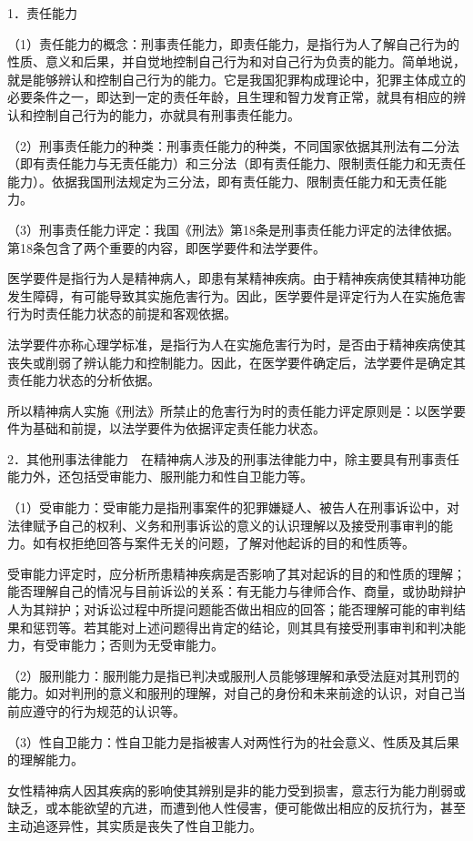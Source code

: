 1．责任能力

（1）责任能力的概念：刑事责任能力，即责任能力，是指行为人了解自己行为的性质、意义和后果，并自觉地控制自己行为和对自己行为负责的能力。简单地说，就是能够辨认和控制自己行为的能力。它是我国犯罪构成理论中，犯罪主体成立的必要条件之一，即达到一定的责任年龄，且生理和智力发育正常，就具有相应的辨认和控制自己行为的能力，亦就具有刑事责任能力。

（2）刑事责任能力的种类：刑事责任能力的种类，不同国家依据其刑法有二分法（即有责任能力与无责任能力）和三分法（即有责任能力、限制责任能力和无责任能力）。依据我国刑法规定为三分法，即有责任能力、限制责任能力和无责任能力。

（3）刑事责任能力评定：我国《刑法》第18条是刑事责任能力评定的法律依据。第18条包含了两个重要的内容，即医学要件和法学要件。

医学要件是指行为人是精神病人，即患有某精神疾病。由于精神疾病使其精神功能发生障碍，有可能导致其实施危害行为。因此，医学要件是评定行为人在实施危害行为时责任能力状态的前提和客观依据。

法学要件亦称心理学标准，是指行为人在实施危害行为时，是否由于精神疾病使其丧失或削弱了辨认能力和控制能力。因此，在医学要件确定后，法学要件是确定其责任能力状态的分析依据。

所以精神病人实施《刑法》所禁止的危害行为时的责任能力评定原则是：以医学要件为基础和前提，以法学要件为依据评定责任能力状态。

2．其他刑事法律能力　在精神病人涉及的刑事法律能力中，除主要具有刑事责任能力外，还包括受审能力、服刑能力和性自卫能力等。

（1）受审能力：受审能力是指刑事案件的犯罪嫌疑人、被告人在刑事诉讼中，对法律赋予自己的权利、义务和刑事诉讼的意义的认识理解以及接受刑事审判的能力。如有权拒绝回答与案件无关的问题，了解对他起诉的目的和性质等。

受审能力评定时，应分析所患精神疾病是否影响了其对起诉的目的和性质的理解；能否理解自己的情况与目前诉讼的关系：有无能力与律师合作、商量，或协助辩护人为其辩护；对诉讼过程中所提问题能否做出相应的回答；能否理解可能的审判结果和惩罚等。若其能对上述问题得出肯定的结论，则其具有接受刑事审判和判决能力，有受审能力；否则为无受审能力。

（2）服刑能力：服刑能力是指已判决或服刑人员能够理解和承受法庭对其刑罚的能力。如对判刑的意义和服刑的理解，对自己的身份和未来前途的认识，对自己当前应遵守的行为规范的认识等。

（3）性自卫能力：性自卫能力是指被害人对两性行为的社会意义、性质及其后果的理解能力。

女性精神病人因其疾病的影响使其辨别是非的能力受到损害，意志行为能力削弱或缺乏，或本能欲望的亢进，而遭到他人性侵害，便可能做出相应的反抗行为，甚至主动追逐异性，其实质是丧失了性自卫能力。

